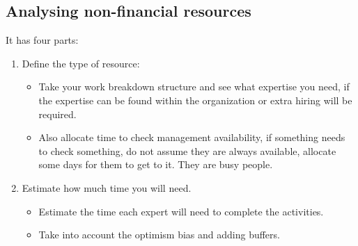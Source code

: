 \subsection{Analysing non-financial resources}
It has four parts:
\begin{enumerate}
    \item Define the type of resource:
        \begin{itemize}
            \item Take your work breakdown structure and see what expertise you need, if the expertise can be found within the organization or extra hiring will be required.
            \item Also allocate time to check management availability, if something needs to check something, do not assume they are always available, allocate some days for them to get to it. They are busy people.
        \end{itemize}

    \item Estimate how much time you will need.
        \begin{itemize}
            \item Estimate the time each expert will need to complete the activities.
            \item Take into account the optimism bias and adding buffers.
        \end{itemize}
        

\end{enumerate}
